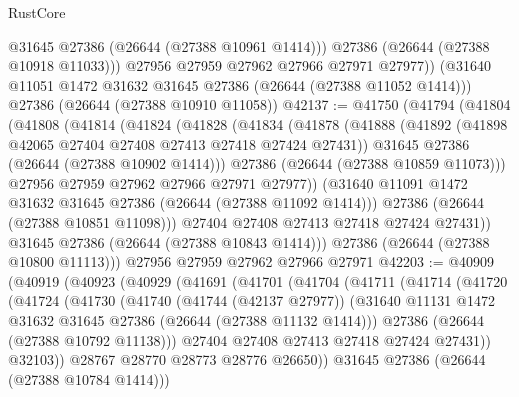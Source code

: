 \begin{lexlean}{RustCore}
\begin{coremodule}
            @31645
            @27386
            (@26644 (@27388 @10961 @1414)))
          @27386
          (@26644 (@27388 @10918 @11033)))
        @27956
        @27959
        @27962
        @27966
        @27971
        @27977))
    (@31640 @11051 @1472 @31632 @31645 @27386 (@26644 (@27388 @11052 @1414)))
    @27386
    (@26644 (@27388 @10910 @11058))
@42137 := @41750
    (@41794
      (@41804
        (@41808
          (@41814
            (@41824
              (@41828
                (@41834
                  (@41878
                    (@41888
                      (@41892 (@41898 @42065 @27404 @27408 @27413 @27418 @27424 @27431))
                      @31645
                      @27386
                      (@26644 (@27388 @10902 @1414)))
                    @27386
                    (@26644 (@27388 @10859 @11073)))
                  @27956
                  @27959
                  @27962
                  @27966
                  @27971
                  @27977))
              (@31640 @11091 @1472 @31632 @31645 @27386 (@26644 (@27388 @11092 @1414)))
              @27386
              (@26644 (@27388 @10851 @11098)))
            @27404
            @27408
            @27413
            @27418
            @27424
            @27431))
        @31645
        @27386
        (@26644 (@27388 @10843 @1414)))
      @27386
      (@26644 (@27388 @10800 @11113)))
    @27956
    @27959
    @27962
    @27966
    @27971
@42203 := @40909
    (@40919
      (@40923
        (@40929
          (@41691
            (@41701
              (@41704
                (@41711
                  (@41714
                    (@41720
                      (@41724
                        (@41730
                          (@41740
                            (@41744 (@42137 @27977))
                            (@31640
                              @11131
                              @1472
                              @31632
                              @31645
                              @27386
                              (@26644 (@27388 @11132 @1414)))
                            @27386
                            (@26644 (@27388 @10792 @11138)))
                          @27404
                          @27408
                          @27413
                          @27418
                          @27424
                          @27431))
                      @32103))
                  @28767
                  @28770
                  @28773
                  @28776
                  @26650))
              @31645
              @27386
              (@26644 (@27388 @10784 @1414)))

\end{coremodule}
\end{lexlean}
